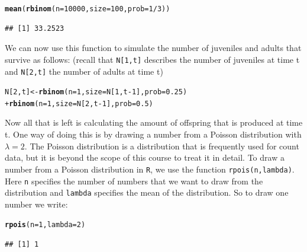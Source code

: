 \documentclass{article}\usepackage[]{graphicx}\usepackage[]{color}
\makeatletter
\newcommand{\hlnum}[1]{\textcolor[rgb]{0.686,0.059,0.569}{#1}}%
\newcommand{\hlopt}[1]{\textcolor[rgb]{0,0,0}{#1}}%
\newcommand{\hlstd}[1]{\textcolor[rgb]{0.345,0.345,0.345}{#1}}%
\newcommand{\hlkwb}[1]{\textcolor[rgb]{0.69,0.353,0.396}{#1}}%
\newcommand{\hlkwc}[1]{\textcolor[rgb]{0.333,0.667,0.333}{#1}}%
\newcommand{\hlkwd}[1]{\textcolor[rgb]{0.737,0.353,0.396}{\textbf{#1}}}%
\newenvironment{kframe}{%
 \def\at@end@of@kframe{}%
 \ifinner\ifhmode%
  \def\at@end@of@kframe{\end{minipage}}%
  \begin{minipage}{\columnwidth}%
 \fi\fi%
 \def\FrameCommand##1{\hskip\@totalleftmargin \hskip-\fboxsep
 \colorbox{shadecolor}{##1}\hskip-\fboxsep
     \hskip-\linewidth \hskip-\@totalleftmargin \hskip\columnwidth}%
 \MakeFramed {\advance\hsize-\width
   \@totalleftmargin\z@ \linewidth\hsize
   \@setminipage}}%
 {\par\unskip\endMakeFramed%
 \at@end@of@kframe}
\newenvironment{knitrout}{}{} %
\makeatother
\begin{document}
\begin{knitrout}
\color{fgcolor}\begin{kframe}
\begin{alltt}
\hlkwd{mean}\hlstd{(}\hlkwd{rbinom}\hlstd{(}\hlkwc{n}\hlstd{=}\hlnum{10000}\hlstd{,}\hlkwc{size}\hlstd{=}\hlnum{100}\hlstd{,}\hlkwc{prob}\hlstd{=}\hlnum{1}\hlopt{/}\hlnum{3}\hlstd{))}
\end{alltt}
\begin{verbatim}
## [1] 33.2523
\end{verbatim}
\end{kframe}
\end{knitrout}
We can now use this function to simulate the number of juveniles and adults that survive as follows:
(recall that \texttt{N[1,t]} describes the number of juveniles at time t and \texttt{N[2,t]} the number of adults at time t)
\begin{knitrout}
\color{fgcolor}\begin{kframe}
\begin{alltt}
\hlstd{N[}\hlnum{2}\hlstd{,t]}\hlkwb{<-}\hlkwd{rbinom}\hlstd{(}\hlkwc{n}\hlstd{=}\hlnum{1}\hlstd{,}\hlkwc{size}\hlstd{=N[}\hlnum{1}\hlstd{,t}\hlopt{-}\hlnum{1}\hlstd{],}\hlkwc{prob}\hlstd{=}\hlnum{0.25}\hlstd{)}
        \hlopt{+} \hlkwd{rbinom}\hlstd{(}\hlkwc{n}\hlstd{=}\hlnum{1}\hlstd{,}\hlkwc{size}\hlstd{=N[}\hlnum{2}\hlstd{,t}\hlopt{-}\hlnum{1}\hlstd{],}\hlkwc{prob}\hlstd{=}\hlnum{0.5}\hlstd{)}
\end{alltt}
\end{kframe}
\end{knitrout}
Now all that is left is calculating the amount of offspring that is produced at time t. One way of doing this is by drawing a number from a Poisson distribution with $\lambda=2$. The Poisson distribution is a distribution that is frequently used for count data, but it is beyond the scope of this course to treat it in detail. To draw a number from a Poisson distribution in \texttt{R}, we use the function \texttt{rpois(n,lambda)}. Here \texttt{n} specifies the number of numbers that we want to draw from the distribution and \texttt{lambda} specifies the mean of the distribution. So to draw one number we write:
\begin{knitrout}
\color{fgcolor}\begin{kframe}
\begin{alltt}
\hlkwd{rpois}\hlstd{(}\hlkwc{n}\hlstd{=}\hlnum{1}\hlstd{,}\hlkwc{lambda}\hlstd{=}\hlnum{2}\hlstd{)}
\end{alltt}
\begin{verbatim}
## [1] 1
\end{verbatim}
\end{kframe}
\end{knitrout}
\end{document}
